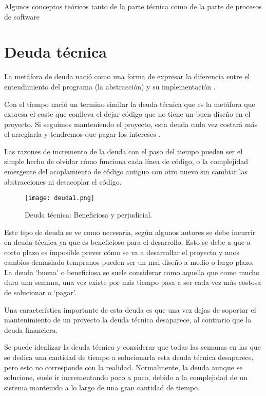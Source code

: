 
Algunos conceptos teóricos tanto de la parte técnica como de la parte de procesos de software


\section{Deuda técnica}

La metáfora de deuda nació como una forma de expresar la diferencia entre el entendimiento del programa (la abstracción) y su implementación \cite{cu09}.

Con el tiempo nació un termino similar la deuda técnica que es la metáfora que expresa el coste que conlleva el dejar código que no tiene un buen diseño en el proyecto. Si seguimos manteniendo el proyecto, esta deuda cada vez costará más el arreglarla y tendremos que pagar los intereses \cite{fow03}.

Las razones de incremento de la deuda con el paso del tiempo pueden ser el simple hecho de olvidar cómo funciona cada línea de código, o la complejidad emergente del acoplamiento de código antiguo con otro nuevo sin cambiar las abstracciones ni desacoplar el código.

\begin{figure}
	\centering
	\texttt{[image: deuda1.png]}
	\caption{Deuda técnica: Beneficiosa y perjudicial\cite{kni13}.}\label{fig:deuda1.png}
\end{figure}


Este tipo de deuda se ve como necesaria, según algunos autores \cite{kni13} se debe incurrir en deuda técnica ya que es beneficioso para el desarrollo. Esto se debe a que a corto plazo es imposible prever cómo se va a desarrollar el proyecto y unos cambios demasiado tempranos pueden ser un mal diseño a medio o largo plazo. La deuda `buena' o beneficiosa se suele considerar como aquella que como mucho dura una semana, una vez existe por más tiempo pasa a ser cada vez más costosa de solucionar o `pagar'.


Una característica importante de esta deuda es que una vez dejas de soportar el mantenimiento de un proyecto la deuda técnica desaparece, al contrario que la deuda financiera.

Se puede idealizar la deuda técnica y considerar que todas las semanas en las que se dedica una cantidad de tiempo a solucionarla esta deuda técnica desaparece, pero esto no corresponde con la realidad. Normalmente, la deuda aunque se solucione, suele ir incrementando poco a poco, debido a la complejidad de un sistema mantenido a lo largo de una gran cantidad de tiempo.

